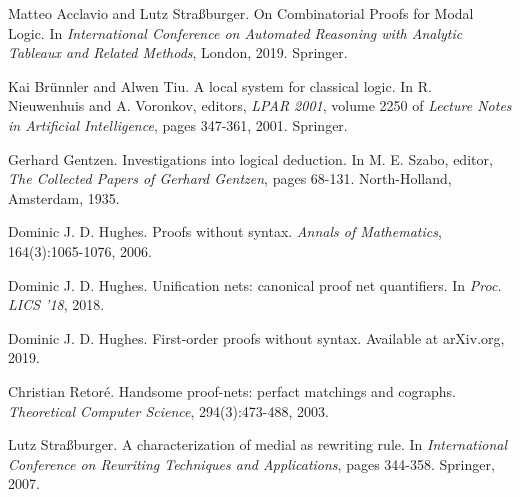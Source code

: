 \vspace{-0.3em}

\begin{thebibliography}{99}

  Matteo Acclavio and Lutz Straßburger. On Combinatorial Proofs for Modal Logic. In \textit{International Conference on Automated Reasoning with Analytic Tableaux and Related Methods}, London, 2019. Springer.

  Kai Brünnler and Alwen Tiu. A local system for classical logic. In R. Nieuwenhuis and A. Voronkov, editors, \textit{LPAR 2001}, volume 2250 of \textit{Lecture Notes in Artificial Intelligence}, pages 347-361, 2001. Springer.

  Gerhard Gentzen. Investigations into logical deduction. In M. E. Szabo, editor, \textit{The Collected Papers of Gerhard Gentzen}, pages 68-131. North-Holland, Amsterdam, 1935.

  Dominic J. D. Hughes. Proofs without syntax. \textit{Annals of Mathematics}, 164(3):1065-1076, 2006.

  Dominic J. D. Hughes.  Unification nets: canonical proof net quantifiers. In \textit{Proc. LICS '18}, 2018.

  Dominic J. D. Hughes. First-order proofs without syntax. Available at arXiv.org, 2019.

  Christian Retoré. Handsome proof-nets: perfact matchings and cographs. \textit{Theoretical Computer Science}, 294(3):473-488, 2003.

	Lutz Straßburger. A characterization of medial as rewriting rule. In
		\textit{International Conference on Rewriting Techniques and
		Applications}, pages 344-358. Springer, 2007.

\end{thebibliography}
